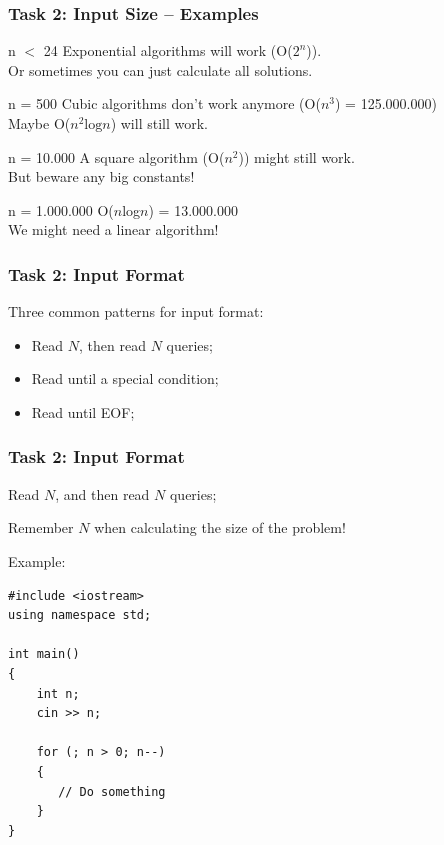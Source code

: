 \documentclass{beamer}
\begin{document}
\begin{frame}
  \frametitle{Task 2: Input Size -- Examples}

  \begin{block}{n $<$ 24}
    Exponential algorithms will work (O($2^n$)).\\
    Or sometimes you can just calculate all solutions.
  \end{block}

  \begin{block}{n = 500}
    Cubic algorithms don't work anymore (O($n^3$) = 125.000.000)\\
    Maybe O($n^2\text{log}n$) will still work.
  \end{block}

  \begin{block}{n = 10.000}
    A square algorithm (O($n^2$)) might still work.\\
    But beware any big constants!
  \end{block}

  \begin{block}{n = 1.000.000}
    O($n$log$n$) = 13.000.000\\
    We might need a linear algorithm!
  \end{block}
\end{frame}

\begin{frame}
  \frametitle{Task 2: Input Format}

  Three common patterns for input format:
  \vfill

  \begin{itemize}
  \item Read $N$, then read $N$ queries;
  \bigskip

  \item Read until a special condition;
  \bigskip

  \item Read until EOF;
  \end{itemize}
\end{frame}

\begin{frame}[fragile]
  \frametitle{Task 2: Input Format}
  \begin{block}{}
    Read $N$, and then read $N$ queries;
    \bigskip

    Remember $N$ when calculating the size of the problem!
  \end{block}
  Example: 

{\smaller
\begin{verbatim}
#include <iostream>
using namespace std;

int main()
{
    int n;
    cin >> n;

    for (; n > 0; n--)
    {
       // Do something
    }
}
\end{verbatim}}

\end{frame}
\end{document}
